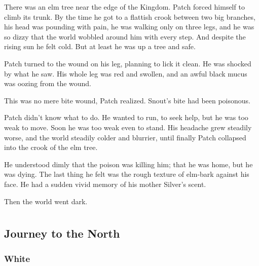 \documentclass[12pt]{book}
\begin{document}
 There was an elm tree near the edge of the Kingdom. Patch forced himself to climb its trunk. By the time he got to a flattish crook between two big branches, his head was pounding with pain, he was walking only on three legs, and he was so dizzy that the world wobbled around him with every step. And despite the rising sun he felt cold. But at least he was up a tree and safe.\par
Patch turned to the wound on his leg, planning to lick it clean. He was shocked by what he saw. His whole leg was red and swollen, and an awful black mucus was oozing from the wound.\par
 This was no mere bite wound, Patch realized. Snout's bite had been poisonous.\par
Patch didn't know what to do. He wanted to run, to seek help, but he was too weak to move. Soon he was too weak even to stand. His headache grew steadily worse, and the world steadily colder and blurrier, until finally Patch collapsed into the crook of the elm tree.\par
He understood dimly that the poison was killing him; that he was home, but he was dying. The last thing he felt was the rough texture of elm-bark against his face. He had a sudden vivid memory of his mother Silver's scent.\par
Then the world went dark.\par

\part{}

\chapter{Journey to the North}

\section{White}
\end{document}
